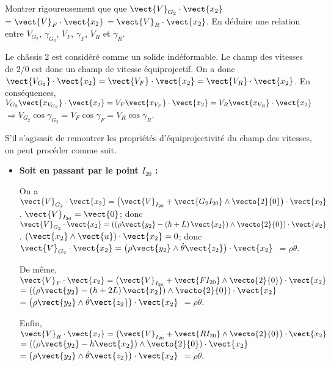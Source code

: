 \documentclass[11pt]{article}
\begin{document}
\UPSTIquestion Montrer rigoureusement que que $\vect{V}_{G_2}\cdot\vect{x_2}$ $=\vect{V}_{F}\cdot\vect{x_2}$ $=\vect{V}_{R}\cdot\vect{x_2}$. En déduire une relation entre $V_{G_2}$, $\gamma_{G_2}$, $V_F$, $\gamma_F$, $V_R$ et $\gamma_R$. 

\begin{UPSTIcorrige}

Le châssis 2 est considéré comme un solide indéformable. Le champ des vitesses de 2/0 est donc un champ de vitesse équiprojectif.
On a donc $\vect{V_{G_2}}\cdot\vect{x_2} =  \vect{V_{F}}\cdot\vect{x_2}  = \vect{V_{R}}\cdot\vect{x_2} $.
En conséquences, 
$V_{G_2} \vect{x_{V_{G_2}}} \cdot \vect{x_2} 
=V_{F} \vect{x_{V_{F}}} \cdot \vect{x_2} 
=V_{R} \vect{x_{V_{R}}} \cdot \vect{x_2} $
$\Rightarrow V_{G_2} \cos \gamma_{G_2} = V_{F} \cos \gamma_{F} =V_{R} \cos\gamma_R $.


\vspace{1cm}

{\footnotesize S'il s'agissait de remontrer les propriétés d'équiprojectivité du champ des vitesses, on peut procéder comme suit.

\begin{itemize}
\item \textbf{Soit en passant par le point $I_{20}$ :}

On a $\vect{V}_{G_2} \cdot \vect{x_2}=\left(\vect{V}_{I_{20}}+\vect{G_2 I_{20}}\wedge \vecto{2}{0}\right)  \cdot \vect{x_2}$. $\vect{V}_{I_{20}}=\vect{0}$; donc $\vect{V}_{G_2} \cdot \vect{x_2}=\left(\left(\rho \vect{y_2} - \left(h+L\right)\vect{x_2}\right) \wedge \vecto{2}{0}\right)  \cdot \vect{x_2}$ .  $\left(\vect{x_2}\wedge \vect{u}\right)\cdot \vect{x_2} = 0$; donc 
$\vect{V}_{G_2} \cdot \vect{x_2}=\left(\rho \vect{y_2}  \wedge  \dot{\theta} \vect{z_2}\right)  \cdot \vect{x_2}$
$=\rho \dot{\theta} $.

De même,  $\vect{V}_{F} \cdot \vect{x_2} =\left(\vect{V}_{I_{20}}+\vect{F I_{20}}\wedge \vecto{2}{0}\right) \cdot \vect{x_2}$
$=\left(\left(\rho \vect{y_2} - \left(h+2L\right)\vect{x_2}\right)\wedge \vecto{2}{0}\right) \cdot \vect{x_2}$
$=\left(\rho \vect{y_2} \wedge  \dot{\theta} \vect{z_2}\right) \cdot \vect{x_2}$
$=\rho \dot{\theta} $.

Enfin, $\vect{V}_{R}\cdot \vect{x_2}=\left(\vect{V}_{I_{20}}+\vect{R I_{20}}\wedge \vecto{2}{0}\right) \cdot \vect{x_2}$
$=\left( \left(\rho \vect{y_2} - h\vect{x_2}\right)\wedge \vecto{2}{0}\right) \cdot \vect{x_2}$
$=\left(\rho \vect{y_2} \wedge \dot{\theta} \vect{z_2}\right) \cdot \vect{x_2}$
$=\rho \dot{\theta} $.


\end{itemize}}
\end{UPSTIcorrige}
\end{document}
